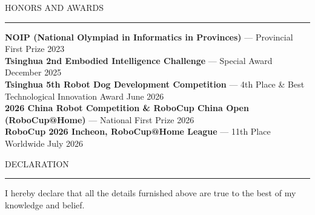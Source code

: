 \documentclass{resume} %
\renewenvironment{rSection}[1]{
\sectionskip
\textcolor{TsinghuaPurple}{\MakeUppercase{#1}}
\sectionlineskip
\hrule
\begin{list}{}{
\setlength{\leftmargin}{0em}
}
\item[]
}{
\end{list}
}
\begin{document}
\begin{rSection}{Honors and Awards} \itemsep -2pt

\textbf{NOIP (National Olympiad in Informatics in Provinces)} --- Provincial First Prize \hfill 2023 \\
\textbf{Tsinghua 2nd Embodied Intelligence Challenge} --- Special Award \hfill December 2025 \\
\textbf{Tsinghua 5th Robot Dog Development Competition} --- 4th Place \& Best Technological Innovation Award \hfill June 2026 \\
\textbf{2026 China Robot Competition \& RoboCup China Open (RoboCup@Home)} --- National First Prize \hfill 2026 \\
\textbf{RoboCup 2026 Incheon, RoboCup@Home League} --- 11th Place Worldwide \hfill July 2026 \\

\end{rSection}



\begin{rSection}{ Declaration  } \itemsep -3pt        

\item I hereby declare that all the details furnished above are true to the best of my knowledge and belief.   
  
\end{rSection}
\end{document}
